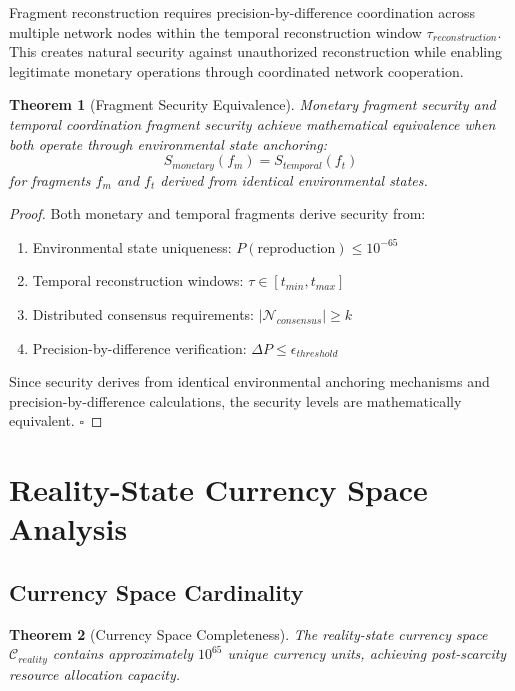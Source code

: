 \documentclass[12pt,a4paper]{article}
\newtheorem{theorem}{Theorem}
\begin{document}
Fragment reconstruction requires precision-by-difference coordination across multiple network nodes within the temporal reconstruction window $\tau_{reconstruction}$. This creates natural security against unauthorized reconstruction while enabling legitimate monetary operations through coordinated network cooperation.

\begin{theorem}[Fragment Security Equivalence]
Monetary fragment security and temporal coordination fragment security achieve mathematical equivalence when both operate through environmental state anchoring:
\begin{equation}
S_{monetary}(f_m) = S_{temporal}(f_t)
\end{equation}
for fragments $f_m$ and $f_t$ derived from identical environmental states.
\end{theorem}

\begin{proof}
Both monetary and temporal fragments derive security from:
\begin{enumerate}
\item Environmental state uniqueness: $P(\text{reproduction}) \leq 10^{-65}$
\item Temporal reconstruction windows: $\tau \in [t_{min}, t_{max}]$
\item Distributed consensus requirements: $|\mathcal{N}_{consensus}| \geq k$
\item Precision-by-difference verification: $\Delta P \leq \epsilon_{threshold}$
\end{enumerate}

Since security derives from identical environmental anchoring mechanisms and precision-by-difference calculations, the security levels are mathematically equivalent. $\square$
\end{proof}

\section{Reality-State Currency Space Analysis}

\subsection{Currency Space Cardinality}

\begin{theorem}[Currency Space Completeness]
The reality-state currency space $\mathcal{C}_{reality}$ contains approximately $10^{65}$ unique currency units, achieving post-scarcity resource allocation capacity.
\end{theorem}
\end{document}
